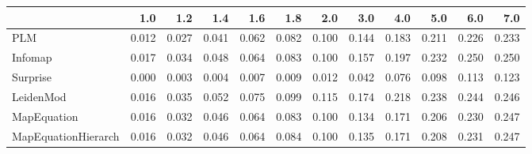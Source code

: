 \begin{tabular}{lrrrrrrrrrrr}
\toprule
{} &   1.0 &   1.2 &   1.4 &   1.6 &   1.8 &   2.0 &   3.0 &   4.0 &   5.0 &   6.0 &   7.0 \\
\midrule
PLM                 & 0.012 & 0.027 & 0.041 & 0.062 & 0.082 & 0.100 & 0.144 & 0.183 & 0.211 & 0.226 & 0.233 \\
Infomap             & 0.017 & 0.034 & 0.048 & 0.064 & 0.083 & 0.100 & 0.157 & 0.197 & 0.232 & 0.250 & 0.250 \\
Surprise            & 0.000 & 0.003 & 0.004 & 0.007 & 0.009 & 0.012 & 0.042 & 0.076 & 0.098 & 0.113 & 0.123 \\
LeidenMod           & 0.016 & 0.035 & 0.052 & 0.075 & 0.099 & 0.115 & 0.174 & 0.218 & 0.238 & 0.244 & 0.246 \\
MapEquation         & 0.016 & 0.032 & 0.046 & 0.064 & 0.083 & 0.100 & 0.134 & 0.171 & 0.206 & 0.230 & 0.247 \\
MapEquationHierarch & 0.016 & 0.032 & 0.046 & 0.064 & 0.084 & 0.100 & 0.135 & 0.171 & 0.208 & 0.231 & 0.247 \\
\bottomrule
\end{tabular}
